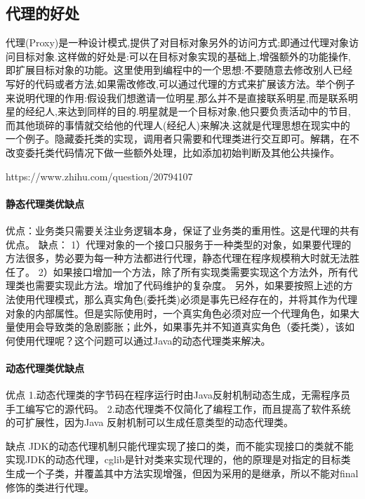\documentclass[../../../interview-questions.tex]{subfiles}
\begin{document}
\subsection{代理的好处}

代理(Proxy)是一种设计模式,提供了对目标对象另外的访问方式;即通过代理对象访问目标对象.这样做的好处是:可以在目标对象实现的基础上,增强额外的功能操作,即扩展目标对象的功能。这里使用到编程中的一个思想:不要随意去修改别人已经写好的代码或者方法,如果需改修改,可以通过代理的方式来扩展该方法。举个例子来说明代理的作用:假设我们想邀请一位明星,那么并不是直接联系明星,而是联系明星的经纪人,来达到同样的目的.明星就是一个目标对象,他只要负责活动中的节目,而其他琐碎的事情就交给他的代理人(经纪人)来解决.这就是代理思想在现实中的一个例子。隐藏委托类的实现，调用者只需要和代理类进行交互即可。解耦，在不改变委托类代码情况下做一些额外处理，比如添加初始判断及其他公共操作。

https://www.zhihu.com/question/20794107

\paragraph{静态代理类优缺点}

优点：业务类只需要关注业务逻辑本身，保证了业务类的重用性。这是代理的共有优点。
缺点：
1）代理对象的一个接口只服务于一种类型的对象，如果要代理的方法很多，势必要为每一种方法都进行代理，静态代理在程序规模稍大时就无法胜任了。
2）如果接口增加一个方法，除了所有实现类需要实现这个方法外，所有代理类也需要实现此方法。增加了代码维护的复杂度。
另外，如果要按照上述的方法使用代理模式，那么真实角色(委托类)必须是事先已经存在的，并将其作为代理对象的内部属性。但是实际使用时，一个真实角色必须对应一个代理角色，如果大量使用会导致类的急剧膨胀；此外，如果事先并不知道真实角色（委托类），该如何使用代理呢？这个问题可以通过Java的动态代理类来解决。

\paragraph{动态代理类优缺点}

优点
1.动态代理类的字节码在程序运行时由Java反射机制动态生成，无需程序员手工编写它的源代码。
2.动态代理类不仅简化了编程工作，而且提高了软件系统的可扩展性，因为Java 反射机制可以生成任意类型的动态代理类。

缺点
JDK的动态代理机制只能代理实现了接口的类，而不能实现接口的类就不能实现JDK的动态代理，cglib是针对类来实现代理的，他的原理是对指定的目标类生成一个子类，并覆盖其中方法实现增强，但因为采用的是继承，所以不能对final修饰的类进行代理。
\end{document}
